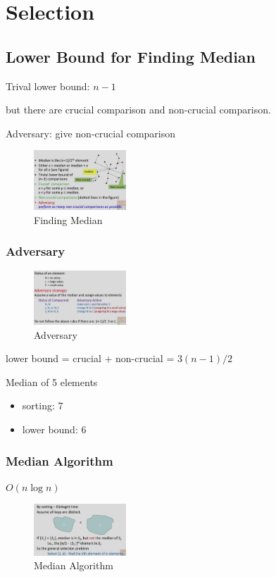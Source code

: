 \newpage
\section{Selection}
\subsection{Lower Bound for Finding Median}

Trival lower bound: $n-1$

but there are crucial comparison and non-crucial comparison.

Adversary: give non-crucial comparison

\begin{figure}[H]
    \centering
    \includegraphics[width=0.309\textwidth]{pic/DAA3/Finding Median}
    \caption{Finding Median}
\end{figure}

\subsubsection{Adversary}
\begin{figure}[H]
    \centering
    \includegraphics[width=0.309\textwidth]{pic/DAA3/Adversary}
    \caption{Adversary}
\end{figure}

lower bound = crucial + non-crucial = $3(n-1)/2$

\begin{example}
    Median of 5 elements
    \begin{itemize}
        \item sorting: 7
        \item lower bound: 6
    \end{itemize}
\end{example}

\subsubsection{Median Algorithm}
$O(n\log n)$
\begin{figure}[H]
    \centering
    \includegraphics[width=0.309\textwidth]{pic/DAA3/Median Algorithm}
    \caption{Median Algorithm}
\end{figure}


